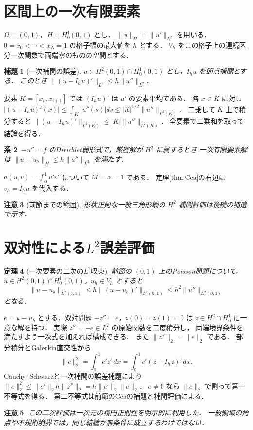 \documentclass[a5paper,10pt,onecolumn]{jsarticle}
\makeatletter
\theoremstyle{mathnotetheorem}
\newtheorem{theorem}{定理}[section]
\newtheorem{lemma}[theorem]{補題}
\newtheorem{corollary}[theorem]{系}
\newtheorem{remark}[theorem]{注意}
\renewcommand{\proofname}{証明}
\renewenvironment{proof}[1][\proofname]{%
  \par\pushQED{\qed}\normalfont\topsep4\p@\@plus2\p@\relax
  \trivlist\item[\hskip\labelsep\bfseries #1]\ignorespaces
}{\popQED\endtrivlist\@endpefalse}
\newcommand{\norm}[1]{\lVert #1\rVert}
\makeatother
\begin{document}
\section{区間上の一次有限要素}
$\Omega=(0,1)$，$H=H_0^1(0,1)$ とし，
$\norm u_H=\norm{u'}_{L^2}$ を用いる．
$0=x_0<\cdots<x_N=1$ の格子幅の最大値を $h$ とする．
$V_h$ をこの格子上の連続区分一次関数で両端零のものの空間とする．
\begin{lemma}[一次補間の誤差]
$u\in H^2(0,1)\cap H_0^1(0,1)$ とし，$I_hu$ を節点補間とする．
このとき $\norm{(u-I_hu)'}_{L^2}\le h\norm{u''}_{L^2}$．
\end{lemma}
\begin{proof}
要素 $K=[x_i,x_{i+1}]$ では $(I_hu)'$ は $u'$ の要素平均である．
各 $x\in K$ に対し
$|(u-I_hu)'(x)|\le\int_K|u''(s)|ds
\le |K|^{1/2}\norm{u''}_{L^2(K)}$．
二乗して $K$ 上で積分すると
$\norm{(u-I_hu)'}_{L^2(K)}\le |K|\norm{u''}_{L^2(K)}$．
全要素で二乗和を取って結論を得る．
\end{proof}
\begin{corollary}
$-u''=f$ のDirichlet弱形式で，厳密解が $H^2$ に属するとき
一次有限要素解は $\norm{u-u_h}_H\le h\norm{u''}_{L^2}$ を満たす．
\end{corollary}
\begin{proof}
$a(u,v)=\int_0^1u'v'$ について $M=\alpha=1$ である．
定理\ref{thm:Cea}の右辺に $v_h=I_hu$ を代入する．
\end{proof}
\begin{remark}[前節までの範囲]
形状正則な一般三角形網の $H^2$ 補間評価は後続の補遺で示す．
\end{remark}


\section{双対性による$L^2$誤差評価}
\begin{theorem}[一次要素の二次の$L^2$収束]
前節の $(0,1)$ 上のPoisson問題について，
$u\in H^2(0,1)\cap H_0^1(0,1)$，$u_h\in V_h$ とすると
\[
 \norm{u-u_h}_{L^2(0,1)}
 \le h\norm{(u-u_h)'}_{L^2(0,1)}
 \le h^2\norm{u''}_{L^2(0,1)}
\]
となる．
\end{theorem}
\begin{proof}
$e=u-u_h$ とする．双対問題 $-z''=e$，$z(0)=z(1)=0$ は
$z\in H^2\cap H_0^1$ に一意な解を持つ．
実際 $z''=-e\in L^2$ の原始関数を二度積分し，
両端境界条件を満たすよう一次式を加えれば構成できる．
また $\norm{z''}_2=\norm e_2$ である．
部分積分とGalerkin直交性から
\[
 \norm e_2^2=\int_0^1e'z'\,dx
 =\int_0^1e'(z-I_hz)'\,dx.
\]
Cauchy--Schwarzと一次補間の誤差補題により
$\norm e_2^2\le\norm{e'}_2 h\norm{z''}_2
=h\norm{e'}_2\norm e_2$．
$e\ne0$ なら $\norm e_2$ で割って第一不等式を得る．
第二不等式は前節のC\'eaの補題と補間評価による．
\end{proof}
\begin{remark}
この二次評価は一次元の楕円正則性を明示的に利用した．
一般領域の角点や不規則境界では，同じ結論が無条件に成立するわけではない．
\end{remark}
\end{document}
